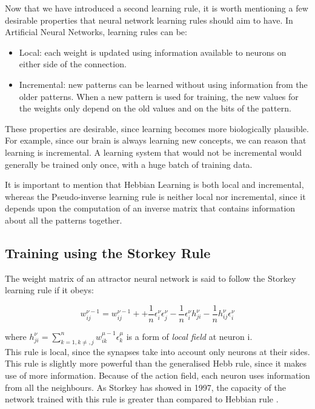 Now that we have introduced a second learning rule, it is worth mentioning a few desirable properties that neural network learning rules should aim to have. In Artificial Neural Networks, learning rules can be:
\begin{itemize}
 \item Local: each weight is updated using information available to neurons on either side of the connection.
 \item Incremental: new patterns can be learned without using information from the older patterns. When a new pattern is used for training, the new values for the weights only depend on the old values and on the bits of the pattern.
\end{itemize}

These properties are desirable, since learning becomes more biologically plausible. For example, since our brain is always learning new concepts, we can reason that learning is incremental. A learning system that would not be incremental would generally be trained only once, with a huge batch of training data.

It is important to mention that Hebbian Learning is both local and incremental, whereas the Pseudo-inverse learning rule is neither local nor incremental, since it depends upon the computation of an inverse matrix that contains information about all the patterns together.

\subsection{Training using the Storkey Rule}

The weight matrix of an attractor neural network is said to follow the Storkey learning rule if it obeys:

\[ w_{ij}^{\nu-1} = w_{ij}^{\nu-1}+
		    +\frac{1}{n}\epsilon_{i}^{\nu} \epsilon_{j}^{\nu} 
		    -\frac{1}{n}\epsilon_{i}^{\nu} h_{ji}^{\nu}
		    -\frac{1}{n}h_{ij}^{\nu} \epsilon_{i}^{\nu}
		    \]

where \( h_{ji}^{\nu} = \sum_{k=1,k\neq,j}^{n} w_{ik}^{\mu-1}\epsilon_{k}^{\mu} \) is a form of \emph{local field} \cite{storkey1997increasing} at neuron i.\\ 
		    
This rule is local, since the synapses take into account only neurons at their sides. This rule is slightly more powerful than the generalised Hebb rule, since it makes use of more information. Because of the action field, each neuron uses information from all the neighbours. As Storkey has showed in 1997, the capacity of the network trained with this rule is greater than compared to Hebbian rule \cite{storkey1997increasing}.




